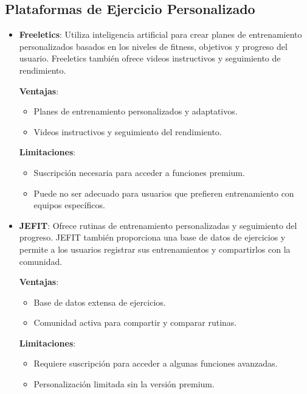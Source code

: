 \subsection{Plataformas de Ejercicio Personalizado}

\begin{itemize}
  \item \textbf{Freeletics}: Utiliza inteligencia artificial para crear planes de entrenamiento personalizados basados en los niveles de fitness, objetivos y progreso del usuario. Freeletics también ofrece videos instructivos y seguimiento de rendimiento.

    \textbf{Ventajas}:
    \begin{itemize}
      \item Planes de entrenamiento personalizados y adaptativos.
      \item Videos instructivos y seguimiento del rendimiento.
    \end{itemize}

    \textbf{Limitaciones}:
    \begin{itemize}
      \item Suscripción necesaria para acceder a funciones premium.
      \item Puede no ser adecuado para usuarios que prefieren entrenamiento con equipos específicos.
    \end{itemize}

  \item \textbf{JEFIT}: Ofrece rutinas de entrenamiento personalizadas y seguimiento del progreso. JEFIT también proporciona una base de datos de ejercicios y permite a los usuarios registrar sus entrenamientos y compartirlos con la comunidad.

    \textbf{Ventajas}:
    \begin{itemize}
      \item Base de datos extensa de ejercicios.
      \item Comunidad activa para compartir y comparar rutinas.
    \end{itemize}

    \textbf{Limitaciones}:
    \begin{itemize}
      \item Requiere suscripción para acceder a algunas funciones avanzadas.
      \item Personalización limitada sin la versión premium.
    \end{itemize}
\end{itemize}

